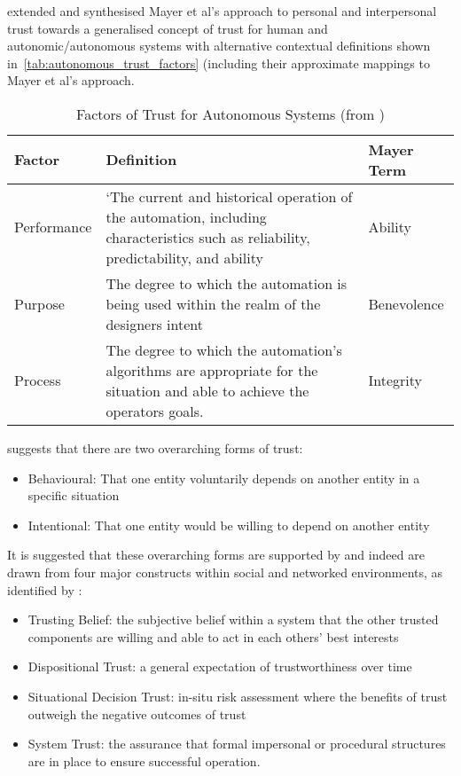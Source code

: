 \citet{Lee2004} extended and synthesised Mayer et al's approach to personal and interpersonal trust towards a generalised concept of trust for human and autonomic/autonomous systems with alternative contextual definitions shown in~\autoref{tab:autonomous_trust_factors} (including their approximate mappings to Mayer et al's approach.

\begin{table}
  \caption[Factors of Trust for Autonomous Systems]{Factors of Trust for Autonomous Systems (from \citet{Lee2004})}
  \label{tab:autonomous_trust_factors}
  \begin{tabularx}{\textwidth}{p{2cm}X p{2cm}}\toprule
    Factor & Definition & Mayer Term\\ \midrule
    Performance & `The current and historical operation of the automation, including characteristics such as reliability, predictability, and ability & Ability\\
    Purpose & The degree to which the automation is being used within the realm of the designers intent & Benevolence \\
    Process & The degree to which the automation's algorithms are appropriate for the situation and able to achieve the operators goals.
    & Integrity\\

    \bottomrule
  \end{tabularx}
\end{table}

\citet{Sun2008} suggests that there are two overarching forms of trust:
\begin{itemize}
  \item Behavioural: That one entity voluntarily depends on another entity in a specific situation
  \item Intentional: That one entity would be willing to depend on another entity
\end{itemize}

It is suggested that these overarching forms are supported by and indeed are drawn from four major constructs within social and networked environments, as identified by \citet{Mcknight1996}:

\begin{itemize}
  \item Trusting Belief: the subjective belief within a system that the other trusted components are willing and able to act in each others’ best interests
  \item Dispositional Trust: a general expectation of trustworthiness over time 
  \item Situational Decision Trust: in-situ risk assessment where the benefits of trust outweigh the negative outcomes of trust
  \item System Trust: the assurance that formal impersonal or procedural structures are in place to ensure successful operation.
\end{itemize}

